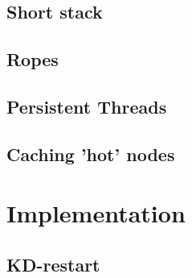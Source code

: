 
\subsection{Short stack}


\subsection{Ropes}


\subsection{Persistent Threads}


\subsection{Caching 'hot' nodes}


\section{Implementation}

\subsection{KD-restart}


